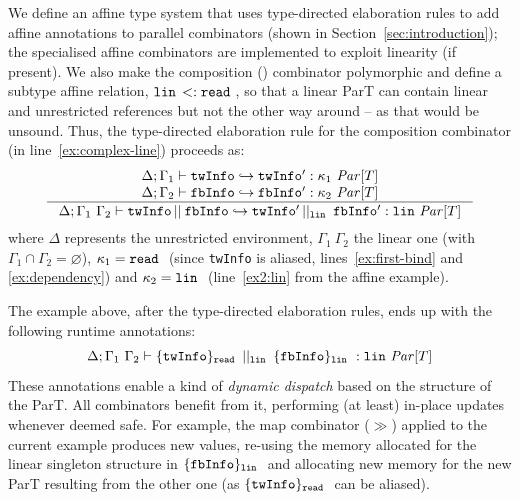 \documentclass[sigplan]{acmart}
\begin{document}
We define an affine type system that uses type-directed
elaboration rules to add affine annotations
to parallel combinators (shown in Section~\ref{sec:introduction});
the specialised affine combinators are implemented to exploit
linearity (if present).
We also make the composition (\parrn{}{}{})
combinator polymorphic and define a subtype affine relation,
$\texttt{lin}\ \! <: \texttt{read}\ $, so that a linear ParT can contain
linear and unrestricted references but not the other way around
-- as that would be unsound.
%
Thus, the type-directed elaboration rule for the
composition combinator (in line~\ref{ex:complex-line})
proceeds as:
%
\[
\begin{array}{c}
 \Delta ; \Gamma_1 \vdash \texttt{twInfo} \e \texttt{twInfo}' : \moden{1}{\typePar{T}} \\
 \Delta ; \Gamma_2 \vdash \texttt{fbInfo} \e \texttt{fbInfo}' : \moden{2}{\typePar{T}} \\
\hline
\raisebox{-1pt}{
$
  \Delta ; \Gamma_1 \ \Gamma_2
  \vdash
  \parrn{}{\texttt{twInfo}}{\texttt{fbInfo}} \e \parrn{\lin{}}{\texttt{twInfo}'}{\texttt{fbInfo}'} : \lin{\typePar{T}}
$
}
\end{array}
\]
%
where $\Delta$ represents the unrestricted environment, $\Gamma_1 \ \Gamma_2$
the linear one (with $\Gamma_1 \cap \Gamma_2 = \varnothing$),
$\kappa_{1} = \texttt{read}\ $ (since
\verb|twInfo| is aliased, lines~\ref{ex:first-bind} and \ref{ex:dependency})
and $\kappa_{2} = \texttt{lin}\ $ (line~\ref{ex2:lin} from the affine example).

The example above, after the type-directed elaboration rules,
ends up with the following runtime annotations:
\[
  \Delta ; \Gamma_1 \ \Gamma_2
  \vdash
  \{ \texttt{twInfo} \}_{\texttt{read}\ } \,||_{\texttt{lin}\ }\, \{ \texttt{fbInfo} \}_{\texttt{lin}\ } : \texttt{lin}\ \mathit{Par}[T]
\]
%
These annotations enable a kind of \emph{dynamic dispatch} based on the
structure of the ParT. All combinators benefit from it,
performing (at least) in-place updates~\cite{DBLP:journals/njc/Hofmann00}
whenever deemed safe. %
For example,
the map combinator ($\gg$) applied to the current example produces
new values, re-using the memory allocated for the linear singleton structure
in $\{ \texttt{fbInfo} \}_{\texttt{lin}\ }$ and allocating new memory for the
new ParT resulting from the other one (as $\{ \texttt{twInfo} \}_{\texttt{read}\ }$ can be aliased).
\end{document}
